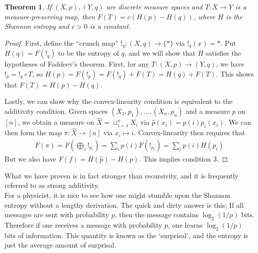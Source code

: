 \documentclass[11pt]{article}
\newtheorem{thm}{Theorem}
\theoremstyle{remark}
\begin{document}
\begin{thm}
  If $(X,p), (Y,q)$ are discrete measure spaces and $T: X \to Y$ is a
  measure-preserving map, then $F(T) = c(H(p) - H(q))$, where $H$ is the Shannon
  entropy and $c > 0$ is a constant.
\end{thm}

\begin{proof}
First, define the ``crunch map'' $!_q: (X, q) \to \{\ast\}$ via
$!_q(x) = \ast$. Put $H(q) = F(!_q)$ to be the entropy of $q$, and we will show
that $H$ satisfies the hypotheses of Faddeev's theorem. First, for any $T: (X,
p) \to (Y,q)$, we have $!_p
= !_q \circ T$, so $H(p) = F(!_p) = F(!_q) + F(T) = H(q) + F(T)$. This shows
that $F(T) = H(p) - H(q)$.

Lastly, we can show why the convex-linearity
condition is equivalent to the additivity condition. Given spaces $(X_1, p_1), \dots,
(X_n, p_n)$ and a measure $p$ on $[n]$, we obtain a measure on $\hat X = \sqcup_{i=1}^n
X_i$ via $\hat p(x_i) = p(i)p_i(x_i)$. We can then form the map $\pi : \hat X
\to [n]$ via $x_i \mapsto i$. Convex-linearity then requires that
\begin{align}
F(\pi) = F(\bigoplus_{i} !_{p_i}) = \sum_i p(i)F(!_{p_i}) = \sum_i p(i)H(p_i)
\end{align}
But we also have $F(f) = H(\hat p) - H(p)$. This implies condition 3.
\end{proof}
What we have proven is in fact stronger than recursivity, and it
is frequently referred to as strong additivity. \\

For a physicist, it is nice to see how one might stumble upon the Shannon
entropy without a lengthy derivation. The quick and dirty answer is this; If all
messages are sent with probability $p$, then the message contains $\log_2(1/p)$
bits. Therefore if one receives a message with probability $p$, one learns
$\log_2(1/p)$ bits of information. This quantity is known as the `surprisal',
and the entropy is just the average amount of surprisal. 
\end{document}
